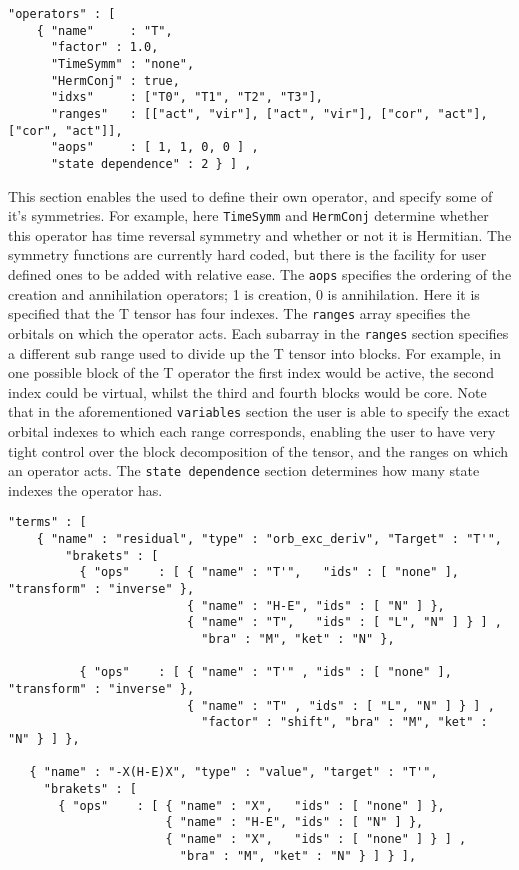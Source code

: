 \begin{lstlisting}[label={lst:operators}]
  "operators" : [
    { "name"     : "T",
      "factor" : 1.0,
      "TimeSymm" : "none",
      "HermConj" : true,
      "idxs"     : ["T0", "T1", "T2", "T3"],
      "ranges"   : [["act", "vir"], ["act", "vir"], ["cor", "act"], ["cor", "act"]],
      "aops"     : [ 1, 1, 0, 0 ] ,
      "state dependence" : 2 } ] ,
\end{lstlisting}         
\noindent This section enables the used to define their own operator, and
specify some of it's symmetries. For example, here \texttt{TimeSymm} and
\texttt{HermConj} determine whether this operator has time reversal symmetry 
and whether or not it is Hermitian. The symmetry functions are 
currently hard coded, but there is the facility for user defined ones
to be added with relative ease.
 The \texttt{aops} specifies the ordering of the   
creation and annihilation operators; 1 is creation, 0 is annihilation.  Here it
is specified that the T tensor has four indexes. The \texttt{ranges} array specifies the
orbitals on which the operator acts.  Each subarray in the \texttt{ranges} section
specifies a different sub range used to divide up the T tensor into blocks.
For example, in one possible block of the T operator the first index would be
active, the second index could be virtual, whilst the third and fourth blocks
would be core.  Note that in the aforementioned \texttt{variables} section the user is
able to specify the exact orbital indexes to which each range corresponds,
enabling the user to have very tight control over the block decomposition of
the tensor, and the ranges on which an operator acts. 
The \texttt{state dependence} section determines how many state indexes 
the operator has.
\begin{lstlisting}[label={lst:terms}]
  "terms" : [
    { "name" : "residual", "type" : "orb_exc_deriv", "Target" : "T'",
        "brakets" : [
          { "ops"    : [ { "name" : "T'",   "ids" : [ "none" ], "transform" : "inverse" },
                         { "name" : "H-E", "ids" : [ "N" ] },
                         { "name" : "T",   "ids" : [ "L", "N" ] } ] ,
                           "bra" : "M", "ket" : "N" }, 

          { "ops"    : [ { "name" : "T'" , "ids" : [ "none" ], "transform" : "inverse" },
                         { "name" : "T" , "ids" : [ "L", "N" ] } ] ,
                           "factor" : "shift", "bra" : "M", "ket" : "N" } ] },

   { "name" : "-X(H-E)X", "type" : "value", "target" : "T'",
     "brakets" : [
       { "ops"    : [ { "name" : "X",   "ids" : [ "none" ] },
                      { "name" : "H-E", "ids" : [ "N" ] },
                      { "name" : "X",   "ids" : [ "none" ] } ] ,
                        "bra" : "M", "ket" : "N" } ] } ],
\end{lstlisting}         
